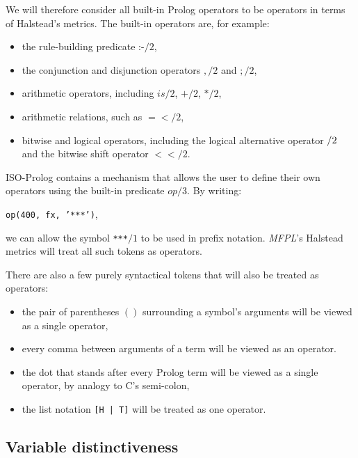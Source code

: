 \documentclass[11pt,a4paper,twoside]{article}
\newcommand{\pname}{\emph{MFPL}}
\begin{document}
\begin{multicols}{2}
We will therefore consider all built-in Prolog operators to be
operators in terms of Halstead's metrics. The built-in operators are,
for example:
\begin{itemize}
\item the rule-building predicate :-$/2$,
\item the conjunction and disjunction operators $,/2$ and $;/2$,
\item arithmetic operators, including $is/2$, $+/2$, $*/2$, 
\item arithmetic relations, such as $=</2$, 
\item bitwise and logical operators, including the logical alternative
  operator $\//2$ and the bitwise shift operator $<</2$.
\end{itemize}

ISO-Prolog contains a mechanism that allows the user to define their
own operators using the built-in predicate $op/3$. By writing: 
\begin{center}
\texttt{op(400, fx, '***')},
\end{center}
 we can allow the symbol \texttt{***}$/1$ to be used in prefix
notation. \pname's Halstead metrics will treat all such tokens as
operators.

There are also a few purely syntactical tokens that will also be
treated as operators:
\begin{itemize}
\item the pair of parentheses $()$ surrounding a symbol's arguments
  will be viewed as a single operator,
\item every comma between arguments of a term will be viewed as an
  operator.
\item the dot that stands after every Prolog term will be viewed as a
  single operator, by analogy to C's semi-colon,
\item the list notation \texttt{[H | T]} will be treated as one
  operator.
\end{itemize}

\subsection{Variable distinctiveness}


\end{multicols}
\end{document}
